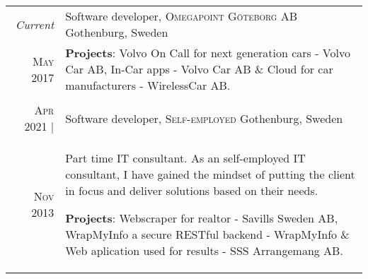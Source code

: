 \documentclass[a4paper,10pt]{scrartcl} %
\begin{document}
\begin{tabular}{r|p{15cm}}
\emph{Current} 	                    & Software developer, \textsc{Omegapoint Göteborg AB} \hfill Gothenburg, Sweden \\
\textsc{May 2017}                   & \footnotesize{
\textbf{Projects}: Volvo On Call for next generation cars - Volvo Car AB, In-Car apps - Volvo Car AB \& Cloud for car manufacturers - WirelessCar AB.} \\
\multicolumn{2}{c}{} \\


\textsc{Apr 2021} |  	            & Software developer, \textsc{Self-employed} \hfill Gothenburg, Sweden \\
\phantom{ab} \textsc{Nov 2013} 	    & \footnotesize{Part time IT consultant. As an self-employed IT consultant, I have gained the mindset of putting the client in focus and deliver solutions based on their needs.

\textbf{Projects}: Webscraper for realtor - Savills Sweden AB, WrapMyInfo a secure RESTful backend - WrapMyInfo \& Web aplication used for results - SSS Arrangemang AB.} \\

\end{tabular}

\end{document}
